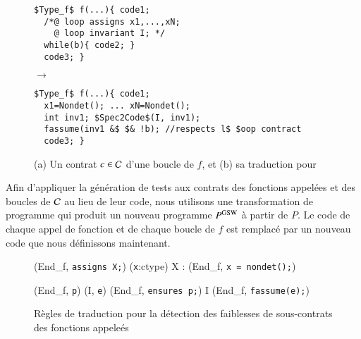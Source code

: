 \begin{figure*}[tb]
\begin{center}
\begin{minipage}{0.35\columnwidth}
\begin{lstlisting}[mathescape]
$Type_f$ f(...){ code1;
  /*@ loop assigns x1,...,xN;
    @ loop invariant I; */
  while(b){ code2; }
  code3; }
\end{lstlisting}
\end{minipage}
\hspace{-6mm}
\begin{minipage}{0.07\columnwidth}$\to$\end{minipage}
\begin{minipage}{0.55\columnwidth}
\begin{lstlisting}[mathescape]
$Type_f$ f(...){ code1;
  x1=Nondet(); ... xN=Nondet();
  int inv1; $Spec2Code$(I, inv1);
  fassume(inv1 &$ $& !b); //respects l$ $oop contract
  code3; }
\end{lstlisting}
\end{minipage}
\vspace{-3mm}
\caption{(a) Un contrat $c\in{\ensuremath\mathcal{C}}$ d'une boucle de $f$, et
(b) sa traduction %
pour \CWD}
\vspace{-3mm}
\label{fig:CW-transf-loops}
\end{center}
\end{figure*}

Afin d'appliquer la génération de tests aux contrats des fonctions appelées et
des boucles de ${\mathcal{C}}$ au lieu de leur code, nous utilisons une transformation de
programme qui produit un nouveau programme $P^{\mathrm{GSW}}$ à partir de $P$.
Le code de chaque appel de fonction et de chaque boucle de $f$ est remplacé
par un nouveau code que nous définissons maintenant.

\begin{figure}[tb]
  \scriptsize{
    {
      {}
      {(End_f, \mbox{\lstinline'assigns X;'})
        \forall (\mbox{\lstinline'x'}:ctype) \in X :
        (End_f, \mbox{\lstinline'x = nondet();'})}{}
    }

    {
      {(End_f, \mbox{\lstinline'p'})  (I, \mbox{\lstinline'e'})}
      {(End_f, \mbox{\lstinline'ensures p;'})
        I \concat (End_f, \mbox{\lstinline'fassume(e);'})}{}
    }
  }
  \caption{Règles de traduction pour la détection des faiblesses de
    sous-contrats des fonctions appeleés}
  \label{fig:assume-annot}
\end{figure}

